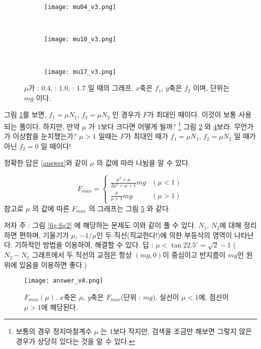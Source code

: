 \documentclass[11pt]{article}
\begin{document}
\begin{figure}[t]
	\centering
	\begin{subfigure}[b]{0.3\linewidth}
		\centering\texttt{[image: mu04\_v3.png]}
		\caption{\label{0.4}}
	\end{subfigure}
	~
	\begin{subfigure}[b]{0.3\linewidth}
		\centering\texttt{[image: mu10\_v3.png]}
		\caption{\label{1.0}}
	\end{subfigure}
	~
	\begin{subfigure}[b]{0.3\linewidth}
		\centering\texttt{[image: mu17\_v3.png]}
		\caption{\label{1.4}}
	\end{subfigure}
	\caption{$\mu$가  : $0.4$,  : $1.0$,  : $1.7$ 일 때의 그래프. $x$축은 $f_{1}$, $y$축은 $f_{2}$ 이며, 단위는 $mg$ 이다.}
\end{figure}

그림 \ref{0.4}를 보면, $ f_{1}=\mu N_{1} $, $ f_{2}=\mu N_{2} $ 인 경우가 $F$가 최대인 때이다. 이것이 보통 사용되는 풀이다. 하지만, 만약 $\mu$ 가 1보다 크다면 어떻게 될까? \footnote{보통의 경우 정지마찰계수 $\mu$ 는 1보다 작지만, 검색을 조금만 해보면 그렇지 않은 경우가 상당히 있다는 것을 알 수 있다.} 그림 \ref{1.0} 와 \ref{1.4}\를 보라. 무언가가 이상함을 눈치챘는가? $\mu > 1$ 일때는 $F$가 최대인 때가 $ f_{1}=\mu N_{1} $, $ f_{2}=\mu N_{2} $ 일 때가 아닌 $f_{2}=0$ 일 때이다!

정확한 답은 \eqref{answer}와 같이 $\mu$ 의 값에 따라 나뉨을 알 수 있다.

\begin{equation} \label{answer}
F_{max} = 
\begin{cases}
\frac{\mu^{2}+\mu}{2\mu^{2}+\mu+1} mg & (\mu < 1)\\ 
\frac{\mu}{\mu+1} mg & (\mu > 1) 
\end{cases}
\end{equation}
참고로 $\mu$ 의 값에 따른 $F_{max}$ 의 그래프는 그림 \ref{answergraph} 와 같다.

저자 주 : 그림 \ref{fig:fig2} 에 해당하는 문제도 이와 같이 풀 수 있다. $N_{1}$, $N_{2}$에 대해 정리하면 편하며, 기울기가 $\mu$, $-1/\mu$인 두 직선(직교한다!)에 의한 부등식의 영역이 나타난다. 기하적인 방법을 이용하여, 해결할 수 있다. 답 : $\mu < \tan{22.5^{\circ}} = \sqrt{2}-1$ ($ N_{2}-N_{1} $ 그래프에서 두 직선의 교점은 항상 $ (mg,0) $이 중심이고 반지름이 $ mg $인 원 위에 있음을 이용하면 좋다.)
\begin{figure}[b]
	\centering
	\texttt{[image: answer\_v4.png]}
	\caption{$F_{max}(\mu)$. $x$축은 $\mu$, $y$축은 $F_{max}$(단위 : $mg$). 실선이 $\mu<1$에, 점선이 $\mu>1$에 해당된다.}
	\label{answergraph}
\end{figure}
\end{document}
